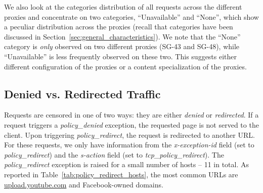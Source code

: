 \documentclass{sig-alternate-2013}
\newcommand{\policydenied}{\emph{policy\_denied}\xspace}
\newcommand{\policyredirect}{\emph{policy\_redirect}\xspace}
\begin{document}
\begin{table}[ht!]
\centering
{}
\caption{Cross correlation of censored domains: Cosine similarity between different proxy servers (day: 2011-08-03).}
  \label{tab:domain_cosine_sg}
\end{table} 



We also look at the categories distribution of all requests across the different proxies and concentrate on two categories, ``Unavailable'' and ``None'', which show a peculiar distribution across the proxies (recall that categories have been discussed in Section~\ref{sec:general_characteristics}).
We note that the ``None'' category is \textit{only} observed on two different proxies (SG-43 and SG-48), while ``Unavailable'' is less frequently observed on these two. This suggests either different configuration of the proxies or a content specialization of the proxies.



\subsection{Denied vs. Redirected Traffic}
Requests are censored in one of two ways: they are either \emph{denied} or \emph{redirected}. If a request triggers a \policydenied exception, the requested page is not served to the client. Upon triggering \policyredirect, the request is redirected to another URL. For these requests, we only have information from the \emph{x-exception-id}   field (set to {\policyredirect}) and the \emph{s-action}  field  (set to {\em tcp\_policy\_redirect}). The \policyredirect exception is raised for a small number of hosts -- 11 in total. As reported in Table~\ref{tab:policy_redirect_hosts}, the most common URLs are \url{upload.youtube.com} and Facebook-owned domains. 
\end{document}
